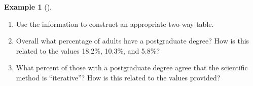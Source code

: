 \documentclass[
  letterpaper,
  DIV=11,
  numbers=noendperiod]{scrreprt}
\providecommand{\tightlist}{%
  \setlength{\itemsep}{0pt}\setlength{\parskip}{0pt}}
\theoremstyle{plain}
\theoremstyle{definition}
\newtheorem{example}{Example}[chapter]
\theoremstyle{definition}
\theoremstyle{definition}
\theoremstyle{remark}
\begin{document}
\begin{tcolorbox}[enhanced jigsaw, opacityback=0, left=2mm, colframe=quarto-callout-note-color-frame, toprule=.15mm, breakable, colback=white, leftrule=.75mm, arc=.35mm, rightrule=.15mm, bottomrule=.15mm]
\begin{example}[]
\begin{enumerate}
\def\labelenumi{\arabic{enumi}.}
\tightlist
\item
  Use the information to construct an appropriate two-way table.
\item
  Overall what percentage of adults have a postgraduate degree? How is
  this related to the values 18.2\%, 10.3\%, and 5.8\%?
\item
  What percent of those with a postgraduate degree agree that the
  scientific method is ``iterative''? How is this related to the values
  provided?
\end{enumerate}

\end{example}

\end{tcolorbox}
\end{document}
